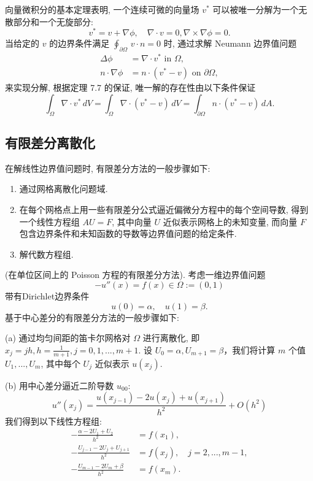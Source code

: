 \documentclass[a4paper]{ctexart}
\newcommand{\hl}[1]
{\noindent {\bf {#1}}}
\begin{document}
{\hl{例子 7.8} 向量微积分的基本定理表明, 
一个连续可微的向量场 $v^*$ 可以被唯一分解为一个无散部分和一个无旋部分:
$$
v^* = v + \nabla \phi, \quad \nabla \cdot v = 0, 
\nabla \times \nabla \phi = 0. 
$$
当给定的 $v$ 的边界条件满足 
$\oint_{\partial \Omega} \, v \cdot n = 0$ 时, 
通过求解 Neumann 边界值问题
\begin{align*}
\Delta \phi &= \nabla \cdot v^* \text{ in } \Omega,\\
n \cdot \nabla \phi &= n \cdot (v^* - v) \text{ on } \partial \Omega, 
\end{align*}
来实现分解, 根据定理 7.7 的保证, 唯一解的存在性由以下条件保证
$$
\int_{\Omega} \nabla \cdot v^* \, 
dV = \int_{\Omega} \nabla \cdot (v^* - v) \, 
dV = \int_{\partial \Omega} n \cdot (v^* - v) \, dA.
$$

\subsection{有限差分离散化}

\hl{公式 7.9} 在解线性边界值问题时, 有限差分方法的一般步骤如下:


\begin{enumerate}
  \item 通过网格离散化问题域.
  \item 在每个网格点上用一些有限差分公式逼近偏微分方程中的每个空间导数, 
  得到一个线性方程组 $AU = F$, 其中向量 $U$ 近似表示网格上的未知变量, 
  而向量 $F$ 包含边界条件和未知函数的导数等边界值问题的给定条件.
  \item 解代数方程组. 
\end{enumerate}

\hl{例子 7.10} (在单位区间上的 Poisson 方程的有限差分方法). 考虑一维边界值问题
$$
-u''(x) = f(x) \in \Omega := (0, 1) 
$$
带有Dirichlet边界条件
$$
u(0) = \alpha, \quad u(1) = \beta. 
$$
基于中心差分的有限差分方法的一般步骤如下:

\noindent (a) 通过均匀间距的笛卡尔网格对 $\Omega$ 进行离散化, 
即 $x_j = jh, h = \frac{1}{m+1}, j = 0, 1, . . . , m + 1$. 
设 $U_0 = \alpha, U_{m+1} = \beta$，我们将计算 $m$ 个值 $U_1, . . . , U_m$, 
其中每个 $U_j$ 近似表示 $u(x_j)$. 

\noindent (b) 用中心差分逼近二阶导数 $u_{00}$:
$$
u''(x_j) = \frac{u(x_{j-1}) - 2u(x_j) + u(x_{j+1})}{h^2} + O(h^2)
$$
我们得到以下线性方程组:
\begin{align*}
-\frac{\alpha - 2U_1 + U_2}{h^2} &= f(x_1), \\
-\frac{U_{j-1} - 2U_j + U_{j+1}}{h^2} &= f(x_j), \quad j = 2, . . . , m - 1, \\
-\frac{U_{m-1} - 2U_m + \beta}{h^2} &= f(x_m).
\end{align*}

}
\end{document}
